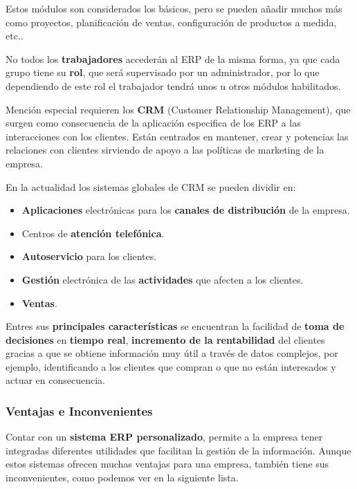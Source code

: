 Estos módulos son considerados los básicos, pero se pueden añadir muchos más como proyectos, planificación de ventas, configuración de productos a medida, etc..

No todos los \textbf{trabajadores} accederán al ERP de la misma forma, ya que cada grupo tiene su \textbf{rol}, que será supervisado por un administrador, por lo que dependiendo de este rol el trabajador tendrá unos u otros módulos habilitados.

Mención especial requieren los \textbf{CRM} (Customer Relationship Management), que surgen como consecuencia de la aplicación especifica de los ERP a las interacciones con los clientes. Están centrados en mantener, crear y potencias las relaciones con clientes sirviendo de apoyo a las políticas de marketing de la empresa.

En la actualidad los sistemas globales de CRM se pueden dividir en:

\begin{itemize}
    \item \textbf{Aplicaciones} electrónicas para los \textbf{canales de distribución} de la empresa.
    \item Centros de \textbf{atención telefónica}.
    \item \textbf{Autoservicio} para los clientes.
    \item \textbf{Gestión} electrónica de las \textbf{actividades} que afecten a los clientes.
    \item \textbf{Ventas}.
\end{itemize}

Entres sus \textbf{principales características} se encuentran la facilidad de \textbf{toma de decisiones} en \textbf{tiempo real}, \textbf{incremento de la rentabilidad} del clientes gracias a que se obtiene información muy útil a través de datos complejos, por ejemplo, identificando a los clientes que compran o que no están interesados y actuar en consecuencia.

\subsubsection{Ventajas e Inconvenientes}
Contar con un \textbf{sistema ERP personalizado}, permite a la empresa tener integradas diferentes utilidades que facilitan la gestión de la información. Aunque estos sistemas ofrecen muchas ventajas para una empresa, también tiene sus inconvenientes, como podemos ver en la siguiente lista.

